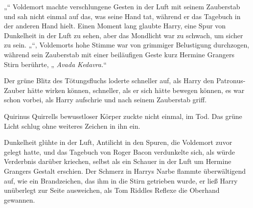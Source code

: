 „“
Voldemort machte verschlungene Gesten in der Luft mit seinem Zauberstab und sah nicht einmal auf das, was seine Hand tat, während er das Tagebuch in der anderen Hand hielt. Einen Moment lang glaubte Harry, eine Spur von Dunkelheit in der Luft zu sehen, aber das Mondlicht war zu schwach, um sicher zu sein.
„“, Voldemorts hohe Stimme war von grimmiger Belustigung durchzogen, während sein Zauberstab mit einer beiläufigen Geste kurz Hermine Grangers Stirn berührte, „ \emph{Avada Kedavra.}“

Der grüne Blitz des Tötungsfluchs loderte schneller auf, als Harry den Patronus-Zauber hätte wirken können, schneller, als er sich hätte bewegen können, es war schon vorbei, als Harry aufschrie und nach seinem Zauberstab griff.

Quirinus Quirrells bewusstloser Körper zuckte nicht einmal, im Tod. Das grüne Licht schlug ohne weiteres Zeichen in ihn ein.

Dunkelheit glühte in der Luft, Antilicht in den Spuren, die Voldemort zuvor gelegt hatte, und das Tagebuch von Roger Bacon verdunkelte sich, als würde Verderbnis darüber kriechen, selbst als ein Schauer in der Luft um Hermine Grangers Gestalt erschien.
Der Schmerz in Harrys Narbe flammte überwältigend auf, wie ein Brandzeichen, das ihm in die Stirn getrieben wurde, er ließ Harry unüberlegt zur Seite ausweichen, als Tom Riddles Reflexe die Oberhand gewannen.

